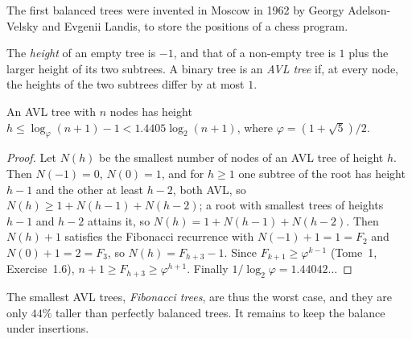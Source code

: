 The first balanced trees were invented in Moscow in 1962 by Georgy Adelson-Velsky and Evgenii Landis, to store the positions of a chess program.

\begin{definition}\label{def:avl}
The \emph{height} of an empty tree is $-1$, and that of a non-empty tree is $1$ plus the larger height of its two subtrees. A binary tree is an
\emph{AVL tree} if, at every node, the heights of the two subtrees differ by at most $1$.
\end{definition}

\begin{theorem}\label{thm:avlheight}
An AVL tree with $n$ nodes has height $h\le\log_\varphi(n+1)-1<1.4405\log_2(n+1)$, where $\varphi=(1+\sqrt5)/2$.
\end{theorem}
\begin{proof}
Let $N(h)$ be the smallest number of nodes of an AVL tree of height $h$. Then $N(-1)=0$, $N(0)=1$, and for $h\ge1$ one subtree of the root has height $h-1$ and the other
at least $h-2$, both AVL, so $N(h)\ge1+N(h-1)+N(h-2)$; a root with smallest trees of heights $h-1$ and $h-2$ attains it, so $N(h)=1+N(h-1)+N(h-2)$. Then $N(h)+1$
satisfies the Fibonacci recurrence with $N(-1)+1=1=F_2$ and $N(0)+1=2=F_3$, so $N(h)=F_{h+3}-1$. Since $F_{k+1}\ge\varphi^{k-1}$ (Tome~1, Exercise~1.6),
$n+1\ge F_{h+3}\ge\varphi^{h+1}$. Finally $1/\log_2\varphi=1.44042\ldots$
\end{proof}

The smallest AVL trees, \emph{Fibonacci trees}, are thus the worst case, and they are only $44\%$ taller than perfectly balanced trees. It remains to
keep the balance under insertions.

